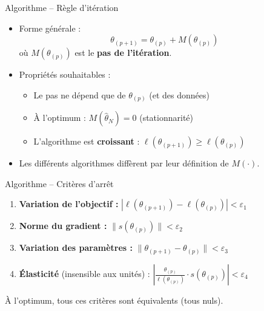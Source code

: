 \documentclass[11pt,aspectratio=169]{beamer}
\begin{document}
\begin{frame}{Algorithme -- Règle d'itération}

\begin{itemize}

\item Forme générale :
  \[
  \theta_{(p+1)} = \theta_{(p)} + M(\theta_{(p)})
  \]
  où $M(\theta_{(p)})$ est le \textbf{pas de l'itération}.\newline

\item Propriétés souhaitables :
  \begin{itemize}
    \item Le pas ne dépend que de $\theta_{(p)}$ (et des données)\newline
    \item À l'optimum : $M(\hat{\theta}_N) = 0$ (stationnarité)\newline
    \item L'algorithme est \textbf{croissant} : $\ell(\theta_{(p+1)}) \geq \ell(\theta_{(p)})$\newline
  \end{itemize}

\item Les différents algorithmes diffèrent par leur définition de $M(\cdot)$.

\end{itemize}

\end{frame}

\begin{frame}{Algorithme -- Critères d'arrêt}

\begin{enumerate}

\item \textbf{Variation de l'objectif :} $|\ell(\theta_{(p+1)}) - \ell(\theta_{(p)})| < \varepsilon_1$\newline

\item \textbf{Norme du gradient :} $\|s(\theta_{(p)})\| < \varepsilon_2$\newline

\item \textbf{Variation des paramètres :} $\|\theta_{(p+1)} - \theta_{(p)}\| < \varepsilon_3$\newline

\item \textbf{Élasticité} (insensible aux unités) : $\left|\frac{\theta_{(p)}}{\ell(\theta_{(p)})} \cdot s(\theta_{(p)})\right| < \varepsilon_4$

\end{enumerate}

\vspace{0.3cm}

À l'optimum, tous ces critères sont équivalents (tous nuls).

\end{frame}
\end{document}
